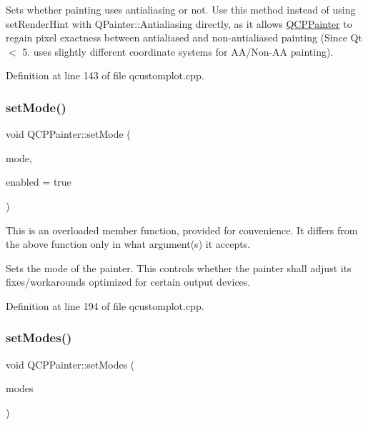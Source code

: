 Sets whether painting uses antialiasing or not. Use this method instead of using set\+Render\+Hint with Q\+Painter\+::\+Antialiasing directly, as it allows \hyperlink{class_q_c_p_painter}{Q\+C\+P\+Painter} to regain pixel exactness between antialiased and non-\/antialiased painting (Since Qt $<$ 5. uses slightly different coordinate systems for A\+A/\+Non-\/\+AA painting). 

Definition at line 143 of file qcustomplot.\+cpp.

\mbox{\label{class_q_c_p_painter_af6b1f7d2bbc548b10aa55d8b6ad49577}} 
\subsubsection{\texorpdfstring{set\+Mode()}{setMode()}}
{\footnotesize\ttfamily void Q\+C\+P\+Painter\+::set\+Mode (\begin{DoxyParamCaption}\item[{\hyperlink{class_q_c_p_painter_a156cf16444ff5e0d81a73c615fdb156d}{Q\+C\+P\+Painter\+::\+Painter\+Mode}}]{mode,  }\item[{bool}]{enabled = {\ttfamily true} }\end{DoxyParamCaption})}

This is an overloaded member function, provided for convenience. It differs from the above function only in what argument(s) it accepts.

Sets the mode of the painter. This controls whether the painter shall adjust its fixes/workarounds optimized for certain output devices. 

Definition at line 194 of file qcustomplot.\+cpp.

\mbox{\label{class_q_c_p_painter_a5fac93adc29c7c4dea9f3e171e9e635e}} 
\subsubsection{\texorpdfstring{set\+Modes()}{setModes()}}
{\footnotesize\ttfamily void Q\+C\+P\+Painter\+::set\+Modes (\begin{DoxyParamCaption}\item[{Painter\+Modes}]{modes }\end{DoxyParamCaption})}

